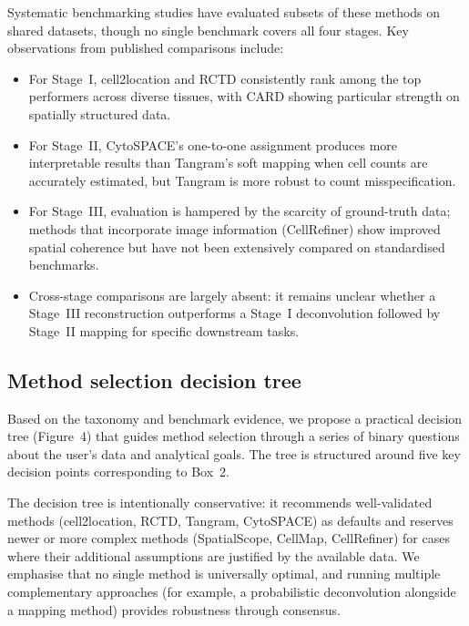 

Systematic benchmarking studies have evaluated subsets of these methods on shared datasets, though no single benchmark covers all four stages. Key observations from published comparisons include:

\begin{itemize}
  \item For Stage~I, cell2location and RCTD consistently rank among the top performers across diverse tissues, with CARD showing particular strength on spatially structured data.
  \item For Stage~II, CytoSPACE's one-to-one assignment produces more interpretable results than Tangram's soft mapping when cell counts are accurately estimated, but Tangram is more robust to count misspecification.
  \item For Stage~III, evaluation is hampered by the scarcity of ground-truth data; methods that incorporate image information (CellRefiner) show improved spatial coherence but have not been extensively compared on standardised benchmarks.
  \item Cross-stage comparisons are largely absent: it remains unclear whether a Stage~III reconstruction outperforms a Stage~I deconvolution followed by Stage~II mapping for specific downstream tasks.
\end{itemize}

\subsection{Method selection decision tree}

Based on the taxonomy and benchmark evidence, we propose a practical decision tree (Figure~4) that guides method selection through a series of binary questions about the user's data and analytical goals. The tree is structured around five key decision points corresponding to Box~2.



The decision tree is intentionally conservative: it recommends well-validated methods (cell2location, RCTD, Tangram, CytoSPACE) as defaults and reserves newer or more complex methods (SpatialScope, CellMap, CellRefiner) for cases where their additional assumptions are justified by the available data. We emphasise that no single method is universally optimal, and running multiple complementary approaches (for example, a probabilistic deconvolution alongside a mapping method) provides robustness through consensus.

